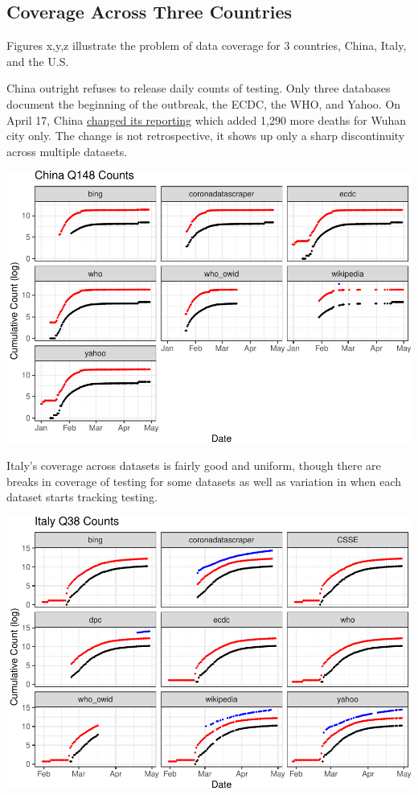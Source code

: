 \documentclass[
]{book}
\begin{document}
\hypertarget{coverage-across-three-countries}{%
\subsection{Coverage Across Three Countries}\label{coverage-across-three-countries}}

Figures x,y,z illustrate the problem of data coverage for 3 countries, China, Italy, and the U.S.

China outright refuses to release daily counts of testing. Only three databases document the beginning of the outbreak, the ECDC, the WHO, and Yahoo. On April 17, China \href{http://en.nhc.gov.cn/2020-04/17/c_79285.htm}{changed its reporting} which added 1,290 more deaths for Wuhan city only. The change is not retrospective, it shows up only a sharp discontinuity across multiple datasets.

\begin{center}\includegraphics[width=1\linewidth]{HowToBeCarefulWithCovid19Counts_files/figure-latex/p_over_time_by_source_china1-1} \end{center}

Italy's coverage across datasets is fairly good and uniform, though there are breaks in coverage of testing for some datasets as well as variation in when each dataset starts tracking testing.

\begin{center}\includegraphics[width=1\linewidth]{HowToBeCarefulWithCovid19Counts_files/figure-latex/p_over_time_by_source_italy1-1} \end{center}
\end{document}
